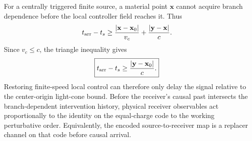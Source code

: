 For a centrally triggered finite source, a material point $\mathbf x$ cannot acquire branch dependence before the local controller field reaches it. Thus
\begin{equation}
t_{\rm arr}-t_s
\ge
\frac{|\mathbf x-\mathbf x_0|}{v_c}
+\frac{|\mathbf y-\mathbf x|}{c}.
\end{equation}
Since $v_c\le c$, the triangle inequality gives
\begin{equation}
\boxed{
t_{\rm arr}-t_s\ge\frac{|\mathbf y-\mathbf x_0|}{c}.}
\end{equation}
Restoring finite-speed local control can therefore only delay the signal relative to the center-origin light-cone bound. Before the receiver's causal past intersects the branch-dependent intervention history, physical receiver observables act proportionally to the identity on the equal-charge code to the working perturbative order. Equivalently, the encoded source-to-receiver map is a replacer channel on that code before causal arrival.
